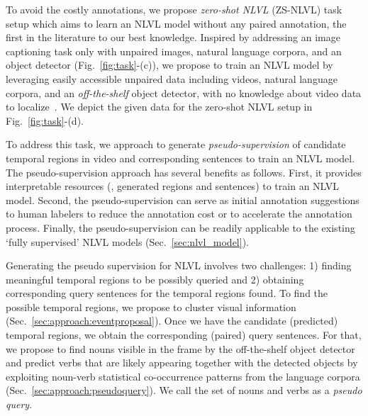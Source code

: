 To avoid the costly annotations, we propose \emph{zero-shot NLVL} (ZS-NLVL) task setup which aims to learn an NLVL model without any paired annotation, the first in the literature to our best knowledge.
Inspired by \cite{Feng2019UnsupervisedIC,laina2019towards} addressing an image captioning task only with unpaired images, natural language corpora, and an object detector (Fig.~\ref{fig:task}-(c)), we propose to train an NLVL model by leveraging easily accessible unpaired data including videos, natural language corpora, and an \emph{off-the-shelf} object detector, with no knowledge about video data to localize~\cite{Feng2019UnsupervisedIC,Artetxe2018UnsupervisedNM}.
We depict the given data for the zero-shot NLVL setup in Fig.~\ref{fig:task}-(d).

To address this task, we approach to generate \emph{pseudo-supervision} of candidate temporal regions in video and corresponding sentences to train an NLVL model.
The pseudo-supervision approach has several benefits as follows.
First, it provides interpretable resources (\ie, generated regions and sentences) to train an NLVL model.
Second, the pseudo-supervision can serve as initial annotation suggestions to human labelers to reduce the annotation cost or to accelerate the annotation process.
Finally, the pseudo-supervision can be readily applicable to the existing `fully supervised' NLVL models (Sec.~\ref{sec:nlvl_model}).


Generating the pseudo supervision for NLVL involves two challenges: 1) finding meaningful temporal regions to be possibly queried and 2) obtaining corresponding query sentences for the temporal regions found.
To find the possible temporal regions, we propose to cluster visual information (Sec.~\ref{sec:approach:eventproposal}).
Once we have the candidate (predicted) temporal regions, we obtain the corresponding (paired) query sentences.
For that, we propose to find nouns visible in the frame by the off-the-shelf object detector and predict verbs that are likely appearing together with the detected objects by exploiting noun-verb statistical co-occurrence patterns from the language corpora (Sec.~\ref{sec:approach:pseudoquery}).
We call the set of nouns and verbs as a \emph{pseudo query}.

